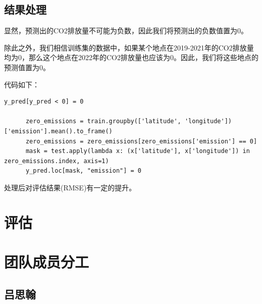 \documentclass{ctexart}
\begin{document}



\subsection{结果处理}

显然，预测出的CO2排放量不可能为负数，因此我们将预测出的负数值置为0。

除此之外，我们相信训练集的数据中，如果某个地点在2019-2021年的CO2排放量均为0，那么这个地点在2022年的CO2排放量也应该为0。因此，我们将这些地点的预测值置为0。

代码如下：

\begin{lstlisting}[style=Python]
      y_pred[y_pred < 0] = 0
      
      zero_emissions = train.groupby(['latitude', 'longitude'])['emission'].mean().to_frame()
      zero_emissions = zero_emissions[zero_emissions['emission'] == 0]
      mask = test.apply(lambda x: (x['latitude'], x['longitude']) in zero_emissions.index, axis=1)
      y_pred.loc[mask, "emission"] = 0
\end{lstlisting}

处理后对评估结果(RMSE)有一定的提升。

\section{评估}

\section{团队成员分工}

\subsection{吕思翰}
\end{document}
